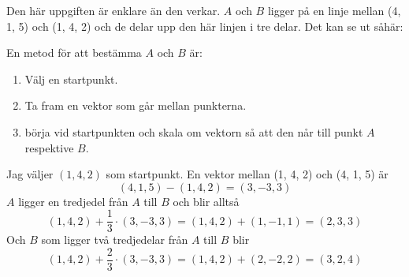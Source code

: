 \documentclass[../../main.tex]{subfiles}
\begin{document}
\begin{solution}{4}
Den här uppgiften är enklare än den verkar. $A$ och $B$ ligger på en linje mellan (4, 1, 5) och (1, 4, 2) och de delar upp den här linjen i tre delar. Det kan se ut såhär:

\begin{center}
\end{center}

En metod för att bestämma $A$ och $B$ är:
\begin{enumerate}
    \item Välj en startpunkt.
    \item Ta fram en vektor som går mellan punkterna. 
    \item börja vid startpunkten och skala om vektorn så att den når till punkt $A$ respektive $B$.
\end{enumerate}

Jag väljer $(1, 4, 2)$ som startpunkt. En vektor mellan (1, 4, 2) och (4, 1, 5) är 
\[(4, 1, 5) - (1, 4, 2) = (3, -3, 3)\]
$A$ ligger en tredjedel från $A$ till $B$ och blir alltså
\[(1, 4, 2) + \frac{1}{3}\cdot(3, -3, 3) = (1, 4, 2) + (1, -1, 1) = (2, 3, 3)\]
Och $B$ som ligger två tredjedelar från $A$ till $B$ blir
\[(1, 4, 2) + \frac{2}{3}\cdot(3, -3, 3) = (1, 4, 2) + (2, -2, 2) = (3, 2, 4)\]

\end{solution}
\end{document}
